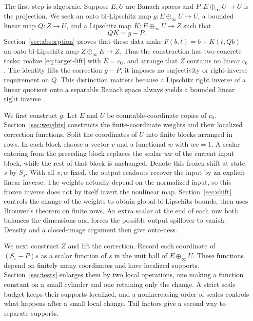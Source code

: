 The first step is algebraic. Suppose \(E,U\) are Banach spaces and
\(P:E\oplus_\infty U\to U\) is the projection. We seek an onto
bi-Lipschitz map \(g:E\oplus_\infty U\to U\), a bounded linear map
\(Q:Z\to U\), and a Lipschitz map \(K:E\oplus_\infty U\to Z\) such that
\begin{equation}
                         QK=g-P.                         \label{eq:target-lift}
\end{equation}
Section~\ref{sec:absorption} proves that these data make
\(F(b,t)=b+K(t,Qb)\) an onto bi-Lipschitz map
\(Z\oplus_\infty E\to Z\). Thus the construction has two concrete
tasks: realize \eqref{eq:target-lift} with \(E=c_0\), and arrange that \(Z\) contains no
linear \(c_0\). The identity lifts the correction \(g-P\);
it imposes no surjectivity or right-inverse requirement on \(Q\).
This distinction matters because a Lipschitz right inverse of a linear
quotient onto a separable Banach space always yields a bounded linear
right inverse \cite[Corollary~3.2]{GK03}.

We first construct \(g\). Let \(E\) and \(U\) be countable-coordinate
copies of \(c_0\). Section~\ref{sec:weights} constructs the finite-coordinate
weights and their localized correction functions. Split the coordinates
of \(U\) into finite blocks arranged
in rows. In each block choose a vector \(v\) and a functional \(w\)
with \(wv=1\). A scalar entering from the preceding block replaces
the scalar \(wx\) of the current input block, while the rest of that
block is unchanged. Denote this frozen shift at state \(s\) by
\(S_s\). With all \(v,w\) fixed, the output readouts recover
the input by an explicit linear inverse. The weights actually depend
on the normalized input, so this frozen inverse does not by itself
invert the nonlinear map. Section~\ref{sec:shift} controls the change
of the weights to obtain global bi-Lipschitz bounds, then uses Brouwer's
theorem on finite rows. An extra scalar at the end of each row both
balances the dimensions and forces the possible output spillover to
vanish. Density and a closed-image argument then give onto-ness.

We next construct \(Z\) and lift the correction. Record each coordinate
of \((S_s-P)s\) as a scalar function of \(s\) in the unit ball of
\(E\oplus_\infty U\). These functions depend on finitely many
coordinates and have localized supports. Section~\ref{sec:tests}
enlarges them by two local operations, one making a function constant
on a small cylinder and one retaining only the change. A strict scale
budget keeps their supports localized, and a nonincreasing order of
scales controls what happens after a small local change. Tail factors
give a second way to separate supports.

